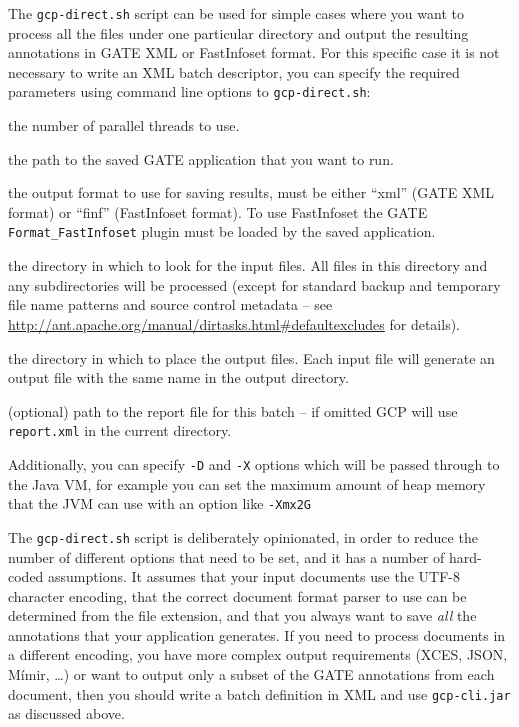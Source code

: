 The \verb!gcp-direct.sh! script can be used for simple cases where you want to
process all the files under one particular directory and output the resulting
annotations in GATE XML or FastInfoset format.  For this specific case it is
not necessary to write an XML batch descriptor, you can specify the required
parameters using command line options to \verb!gcp-direct.sh!:

\bde
\item[-t] the number of parallel threads to use.
\item[-x] the path to the saved GATE application that you want to run.
\item[-f] the output format to use for saving results, must be either ``xml''
  (GATE XML format) or ``finf'' (FastInfoset format).  To use FastInfoset the
  GATE \verb!Format_FastInfoset! plugin must be loaded by the saved
  application.
\item[-i] the directory in which to look for the input files.  All files in
  this directory and any subdirectories will be processed (except for standard
  backup and temporary file name patterns and source control metadata -- see
  \url{http://ant.apache.org/manual/dirtasks.html#defaultexcludes} for
  details).
\item[-o] the directory in which to place the output files.  Each input file
  will generate an output file with the same name in the output directory.
\item[-r] (optional) path to the report file for this batch -- if omitted
  GCP will use \verb!report.xml! in the current directory.
\ede

Additionally, you can specify \verb!-D! and \verb!-X! options which will be
passed through to the Java VM, for example you can set the maximum amount of
heap memory that the JVM can use with an option like \verb!-Xmx2G!

The \verb!gcp-direct.sh! script is deliberately opinionated, in order to reduce
the number of different options that need to be set, and it has a number of
hard-coded assumptions.  It assumes that your input documents use the UTF-8
character encoding, that the correct document format parser to use can be
determined from the file extension, and that you always want to save \emph{all}
the annotations that your application generates.  If you need to process
documents in a different encoding, you have more complex output requirements
(XCES, JSON, M\'{i}mir, \ldots) or want to output only a subset of the GATE
annotations from each document, then you should write a batch definition in XML
and use \verb!gcp-cli.jar! as discussed above.

